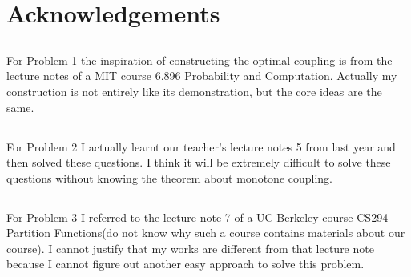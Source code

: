 \documentclass[12pt,letterpaper]{article}
\begin{document}
\newpage
\section{Acknowledgements}
\subsection{}
For Problem 1 the inspiration of constructing the optimal coupling is from the lecture notes of a MIT course 6.896 Probability and Computation.
Actually my construction is not entirely like its demonstration, but the core ideas are the same.\\
\subsection{}
For Problem 2 I actually learnt our teacher's lecture notes 5 from last year and then solved these questions. I think it will be extremely difficult to solve these questions without knowing the theorem about monotone coupling.
\subsection{}
For Problem 3 I referred to the lecture note 7 of a UC Berkeley course CS294 Partition Functions(do not know why such a course contains materials about our course). I cannot justify that my works are different from that lecture note because I cannot figure out another easy approach to solve this problem.
\end{document}
